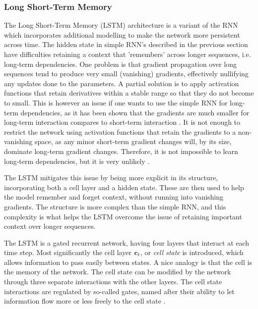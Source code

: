 \documentclass[a4paper,12pt]{article}
\begin{document}
\subsubsection{Long Short-Term Memory}
The Long Short-Term Memory (LSTM) architecture is a variant of the RNN which incorporates additional modelling to make the network more persistent across time. The hidden state in simple RNN's described in the previous section have difficulties retaining a context that 'remembers' across longer sequences, i.e. long-term dependencies. One problem is that gradient propagation over long sequences tend to produce very small (vanishing) gradients, effectively nullifying any updates done to the parameters. A partial solution is to apply activation functions that retain derivatives within a stable range so that they do not become to small. This is however an issue if one wants to use the simple RNN for long-term dependencies, as it has been shown that the gradients are much smaller for long-term interaction compares to short-term interaction \cite{Goodfellow-et-al-2016}. It is not enough to restrict the network using activation functions that retain the gradients to a non-vanishing space, as any minor short-term gradient changes will, by its size, dominate long-term gradient changes. Therefore, it is not impossible to learn long-term dependencies, but it is very unlikely \cite{Goodfellow-et-al-2016}.

The LSTM mitigates this issue by being more explicit in its structure, incorporating both a cell layer and a hidden state. These are then used to help the model remember and forget context, without running into vanishing gradients. The structure is more complex than the simple RNN, and this complexity is what helps the LSTM overcome the issue of retaining important context over longer sequences.


The LSTM is a gated recurrent network, having four layers that interact at each time step. Most significantly the cell layer $\mathbf{ c }_t$, or \textit{cell state} is introduced, which allows information to pass easily between states. A nice analogy is that the cell is the memory of the network. The cell state can be modified by the network through three separate interactions with the other layers. The cell state interactions are regulated by so-called gates, named after their ability to let information flow more or less freely to the cell state \cite{lstmwebsite}.
\end{document}
